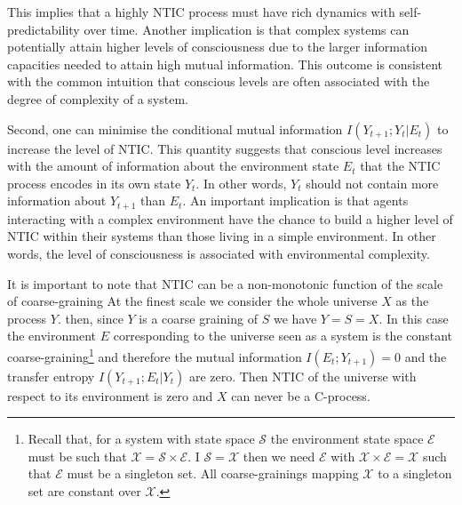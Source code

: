 \documentclass[utf8]{article}
\newcommand{\X}{\mathcal{X}}
\renewcommand{\S}{\mathcal{S}}
\newcommand{\E}{\mathcal{E}}
\begin{document}
            This implies that a highly NTIC process must have rich dynamics with self-predictability over time. Another implication is that complex systems can potentially attain higher levels of consciousness due to the larger information capacities needed to attain high mutual information. This outcome is consistent with the common intuition that conscious levels are often associated with the degree of complexity of a system.
    
    	    Second, one can minimise the conditional mutual information $I(Y_{t+1};Y_{t}|E_{t})$ to increase the level of NTIC. This quantity suggests that conscious level increases with the amount of information about the environment state $E_t$ that the NTIC process encodes in its own state $Y_t$. In other words, $Y_t$ should not contain more information about $Y_{t+1}$ than $E_t$. An important implication is that agents interacting with a complex environment have the chance to build a higher level of NTIC within their systems than those living in a simple environment. In other words, the level of consciousness is associated with environmental complexity. 
    	   
    		It is important to note that NTIC can be a non-monotonic function of the scale of coarse-graining
    		At the finest scale we consider the whole universe $X$ as the process $Y$. then, since $Y$ is a coarse graining of $S$ we have $Y=S=X$.  
    		In this case the environment $E$ corresponding to the universe seen as a system is the constant coarse-graining\footnote{Recall that, for a system with state space $\S$ the environment state space $\E$ must be such that $\X=\S \times \E$. I $\S =\X$ then we need $\E$ with $\X \times \E=\X$ such that $\E$ must be a singleton set. All coarse-grainings mapping $\X$ to a singleton set are constant over $\X$.} and therefore the mutual information $I(E_t;Y_{t+1})=0$ and the transfer entropy $I(Y_{t+1};E_t|Y_t)$ are zero. Then NTIC of the universe with respect to its environment is zero and $X$ can never be a C-process.
    		
\end{document}
